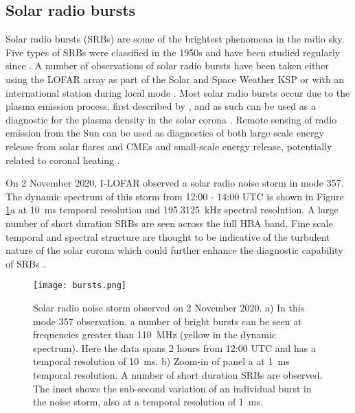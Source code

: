\subsection{Solar radio bursts}
Solar radio bursts (SRBs) are some of the brightest phenomena in the radio sky. Five types of SRBs were classified in the 1950s \citep{Wild1950b, Boischot1957, Wild1959} and have been studied regularly since \citep[See][for a comprehensive review]{Pick2008}. A number of observations of solar radio bursts have been taken either using the LOFAR array as part of the Solar and Space Weather KSP \citep[for example,][]{Zhang2020, Murphy2021} or with an international station during local mode \citep[for example,][]{Morosan2019, Maguire2020, Bartosz2020}. Most solar radio bursts occur due to the plasma emission process, first described by \cite{Ginzburg1958}, and as such can be used as a diagnostic for the plasma density in the solar corona \citep{Melrose1987}. Remote sensing of radio emission from the Sun can be used as diagnostics of both large scale energy release from solar flares and CMEs \citep{Carley2021} and small-scale energy release, potentially related to coronal heating \citep{Mondal2020}.

On 2 November 2020, I-LOFAR observed a solar radio noise storm in mode 357. The dynamic spectrum of this storm from 12:00 - 14:00 UTC is shown in Figure \ref{fig:357_10ms}a at 10~ms temporal resolution and \SI{195.3125}{\kilo \hertz} spectral resolution. A large number of short duration SRBs are seen across the full HBA band. Fine scale temporal and spectral structure are thought to be indicative of the turbulent nature of the solar corona which could further enhance the diagnostic capability of SRBs \citep{Kolotkov2018, Sharykin2018, Reid2021}.

\begin{figure}
    \centering
    \texttt{[image: bursts.png]}
    \caption[Solar radio noise storm observed on 2 November 2020.]{Solar radio noise storm observed on 2 November 2020. a) In this mode 357 observation, a number of bright bursts can be seen at frequencies greater than 110~MHz (yellow in the dynamic spectrum). %
    Here the data spans 2 hours from 12:00 UTC and has a temporal resolution of 10~ms.
    b) Zoom-in of panel a at 1~ms temporal resolution. A number of short duration SRBs are observed. The inset shows the sub-second variation of an individual burst in the noise storm, also at a temporal resolution of 1~ms.}
    \label{fig:357_10ms}
\end{figure}

